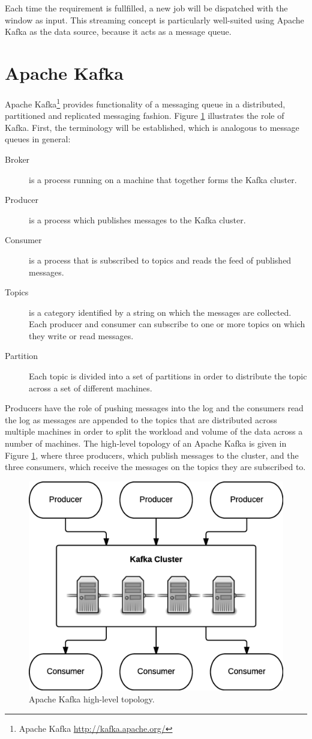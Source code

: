 Each time the requirement is fullfilled, a new job will be dispatched with the window as input. This streaming concept is particularly well-suited using Apache Kafka as the data source, because it acts as a message queue.

\section{Apache Kafka \label{subsec_kafka}}

Apache Kafka\footnote{Apache Kafka \url{http://kafka.apache.org/}} provides functionality of a messaging queue in a distributed, partitioned and replicated messaging fashion. Figure \ref{fig:kafka} illustrates the role of Kafka. First, the terminology will be established, which is analogous to message queues in general:

\begin{description}
    \item[Broker] is a process running on a machine that together forms the Kafka cluster. 
    \item[Producer] is a process which publishes messages to the Kafka cluster.
    \item[Consumer] is a process that is subscribed to topics and reads the feed of published messages.
    \item[Topics] is a category identified by a string on which the messages are collected. Each producer and consumer can subscribe to one or more topics on which they write or read messages.
    \item[Partition] Each topic is divided into a set of partitions in order to distribute the topic across a set of different machines.
\end{description}

Producers have the role of pushing messages into the log and the consumers read the log as messages are appended to the topics that are distributed across multiple machines in order to split the workload and volume of the data across a number of machines. The high-level topology of an Apache Kafka is given in Figure \ref{fig:kafka}, where three producers, which publish messages to the cluster, and the three consumers, which receive the messages on the topics they are subscribed to.

\begin{figure}[ht!]
\centering
\includegraphics[width=.7\textwidth]{figures/kafka.png}
\caption{Apache Kafka high-level topology. \label{fig:kafka}}
\end{figure}

